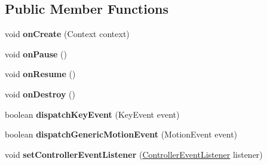\subsection*{Public Member Functions}
\begin{DoxyCompactItemize}
\item 
\mbox{\label{interfaceorg_1_1cocos2dx_1_1lib_1_1GameControllerDelegate_a913f8e6d93ce385092e6c09e2d7189e4}} 
void {\bfseries on\+Create} (Context context)
\item 
\mbox{\label{interfaceorg_1_1cocos2dx_1_1lib_1_1GameControllerDelegate_a999d2b0f4db72f0031de1bab925ef3e5}} 
void {\bfseries on\+Pause} ()
\item 
\mbox{\label{interfaceorg_1_1cocos2dx_1_1lib_1_1GameControllerDelegate_ad304c5401ab5e3b2d145f0293e9a2240}} 
void {\bfseries on\+Resume} ()
\item 
\mbox{\label{interfaceorg_1_1cocos2dx_1_1lib_1_1GameControllerDelegate_a60ac0005faad8bab695801f6d02f6cfb}} 
void {\bfseries on\+Destroy} ()
\item 
\mbox{\label{interfaceorg_1_1cocos2dx_1_1lib_1_1GameControllerDelegate_a80e2023df5a221191efbbaf2cb9fd2f0}} 
boolean {\bfseries dispatch\+Key\+Event} (Key\+Event event)
\item 
\mbox{\label{interfaceorg_1_1cocos2dx_1_1lib_1_1GameControllerDelegate_aca5e5a7b143fe5ad3fd967ad0d157eac}} 
boolean {\bfseries dispatch\+Generic\+Motion\+Event} (Motion\+Event event)
\item 
\mbox{\label{interfaceorg_1_1cocos2dx_1_1lib_1_1GameControllerDelegate_aa38b01e0877dc854360f0bac5b540e68}} 
void {\bfseries set\+Controller\+Event\+Listener} (\hyperlink{interfaceorg_1_1cocos2dx_1_1lib_1_1GameControllerDelegate_1_1ControllerEventListener}{Controller\+Event\+Listener} listener)
\item 
\mbox{\label{interfaceorg_1_1cocos2dx_1_1lib_1_1GameControllerDelegate_a913f8e6d93ce385092e6c09e2d7189e4}} 

\end{DoxyCompactItemize}
